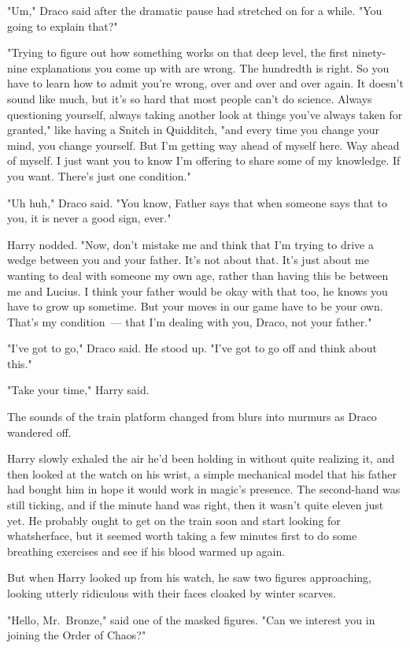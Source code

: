 "Um," Draco said after the dramatic pause had stretched on for a while. "You
going to explain that?"

"Trying to figure out how something works on that deep level, the first
ninety-nine explanations you come up with are wrong. The hundredth is right. So
you have to learn how to admit you're wrong, over and over and over again. It
doesn't sound like much, but it's so hard that most people can't do science.
Always questioning yourself, always taking another look at things you've always
taken for granted," like having a Snitch in Quidditch, "and every time you
change your mind, you change yourself. But I'm getting way ahead of myself
here. Way ahead of myself. I just want you to know{\el} I'm offering to
share some of my knowledge. If you want. There's just one condition."

"Uh huh," Draco said. "You know, Father says that when someone says that to
you, it is never a good sign, ever."

Harry nodded. "Now, don't mistake me and think that I'm trying to drive a wedge
between you and your father. It's not about that. It's just about me wanting to
deal with someone my own age, rather than having this be between me and Lucius.
I think your father would be okay with that too, he knows you have to grow up
sometime. But your moves in our game have to be your own. That's my
condition~--- that I'm dealing with you, Draco, not your father."

"I've got to go," Draco said. He stood up. "I've got to go off and think about
this."

"Take your time," Harry said.

The sounds of the train platform changed from blurs into murmurs as Draco
wandered off.

Harry slowly exhaled the air he'd been holding in without quite realizing it,
and then looked at the watch on his wrist, a simple mechanical model that his
father had bought him in hope it would work in magic's presence. The
second-hand was still ticking, and if the minute hand was right, then it wasn't
quite eleven just yet. He probably ought to get on the train soon and start
looking for whatsherface, but it seemed worth taking a few minutes first to do
some breathing exercises and see if his blood warmed up again.

But when Harry looked up from his watch, he saw two figures approaching,
looking utterly ridiculous with their faces cloaked by winter scarves.

"Hello, Mr.~Bronze," said one of the masked figures. "Can we interest you in
joining the Order of Chaos?"
\sbreak
